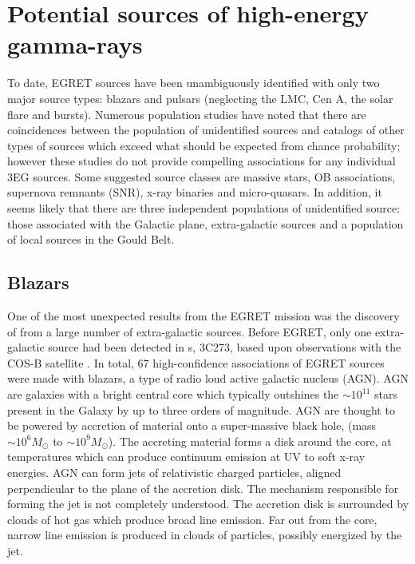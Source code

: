 \chapter{Potential sources of high-energy gamma-rays}
\label{CHAP::SOURCES}

To date, EGRET sources have been unambiguously identified with only
two major source types: blazars and pulsars (neglecting the LMC, Cen
A, the solar flare and \Gray bursts). Numerous population studies have
noted that there are coincidences between the population of
unidentified sources and catalogs of other types of sources which
exceed what should be expected from chance probability; however these
studies do not provide compelling associations for any individual 3EG
sources. Some suggested source classes are massive stars, OB
associations, supernova remnants (SNR), x-ray binaries and
micro-quasars. In addition, it seems likely that there are three
independent populations of unidentified source: those associated with
the Galactic plane, extra-galactic sources and a population of local
sources in the Gould Belt.

\section{Blazars}
\label{SEC::SOURCES::BLAZARS}

One of the most unexpected results from the EGRET mission was the
discovery of \Grays from a large number of extra-galactic
sources. Before EGRET, only one extra-galactic source had been
detected in {\Grayc}s, 3C273, based upon observations with the COS-B
satellite \citep{REF::SWANENBURG::NATURE1978}. In total, 67
high-confidence associations of EGRET sources were made with blazars,
a type of radio loud active galactic nucleus (AGN). AGN are galaxies
with a bright central core which typically outshines the $\sim10^{11}$
stars present in the Galaxy by up to three orders of magnitude. AGN
are thought to be powered by accretion of material onto a
super-massive black hole, (mass $\sim10^6M_\odot$ to
$\sim10^{9}M_\odot$). The accreting material forms a disk around the
core, at temperatures which can produce continuum emission at UV to
soft x-ray energies. AGN can form jets of relativistic charged
particles, aligned perpendicular to the plane of the accretion
disk. The mechanism responsible for forming the jet is not completely
understood. The accretion disk is surrounded by clouds of hot gas
which produce broad line emission. Far out from the core, narrow line
emission is produced in clouds of particles, possibly energized by the
jet.

